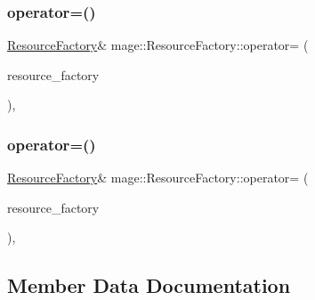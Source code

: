 \subsubsection{\texorpdfstring{operator=()}{operator=()}\hspace{0.1cm}{\footnotesize\ttfamily [1/2]}}
{\footnotesize\ttfamily \hyperlink{classmage_1_1_resource_factory}{Resource\+Factory}\& mage\+::\+Resource\+Factory\+::operator= (\begin{DoxyParamCaption}\item[{const \hyperlink{classmage_1_1_resource_factory}{Resource\+Factory} \&}]{resource\+\_\+factory }\end{DoxyParamCaption})\hspace{0.3cm}{\ttfamily [private]}, {\ttfamily [delete]}}

\hypertarget{classmage_1_1_resource_factory_a4a1a0c064f068329f4b94c47ec17046f}{}\label{classmage_1_1_resource_factory_a4a1a0c064f068329f4b94c47ec17046f} 
\subsubsection{\texorpdfstring{operator=()}{operator=()}\hspace{0.1cm}{\footnotesize\ttfamily [2/2]}}
{\footnotesize\ttfamily \hyperlink{classmage_1_1_resource_factory}{Resource\+Factory}\& mage\+::\+Resource\+Factory\+::operator= (\begin{DoxyParamCaption}\item[{\hyperlink{classmage_1_1_resource_factory}{Resource\+Factory} \&\&}]{resource\+\_\+factory }\end{DoxyParamCaption})\hspace{0.3cm}{\ttfamily [private]}, {\ttfamily [delete]}}



\subsection{Member Data Documentation}
\hypertarget{classmage_1_1_resource_factory_a1739407c8918b375e7feaa2240628bde}{}\label{classmage_1_1_resource_factory_a1739407c8918b375e7feaa2240628bde} 
